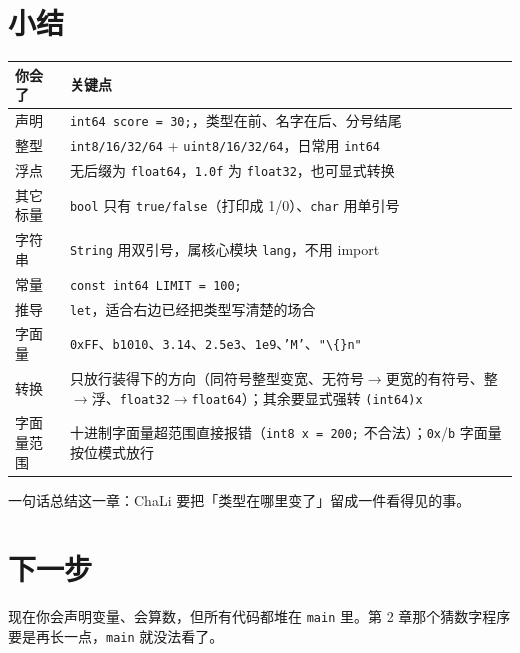 \section{小结}

{\small\setlength{\tabcolsep}{4pt}
\begin{longtable}{>{\raggedright\arraybackslash}p{}>{\raggedright\arraybackslash}p{}}
\toprule
你会了 & 关键点 \\
\midrule
\endhead
声明 & \texttt{int64 score =\allowbreak{} 30;}，类型在前、名字在后、分号结尾 \\
整型 & \texttt{int8/\allowbreak{}16/\allowbreak{}32/\allowbreak{}64} + \texttt{uint8/\allowbreak{}16/\allowbreak{}32/\allowbreak{}64}，日常用 \texttt{int64} \\
浮点 & 无后缀为 \texttt{float64}，\texttt{1.\allowbreak{}0f} 为 \texttt{float32}，也可显式转换 \\
其它标量 & \texttt{bool} 只有 \texttt{true/\allowbreak{}false}（打印成 1/0）、\texttt{char} 用单引号 \\
字符串 & \texttt{String} 用双引号，属核心模块 \texttt{lang}，不用 import \\
常量 & \texttt{const int64 LIMIT =\allowbreak{} 100;} \\
推导 & \texttt{let}，适合右边已经把类型写清楚的场合 \\
字面量 & \texttt{0x\allowbreak{}FF}、\texttt{b1010}、\texttt{3.\allowbreak{}14}、\texttt{2.\allowbreak{}5e3}、\texttt{1e9}、\texttt{'M'}、\texttt{"\textbackslash\{\}n"} \\
转换 & 只放行装得下的方向（同符号整型变宽、无符号\ensuremath{\rightarrow}更宽的有符号、整\ensuremath{\rightarrow}浮、\texttt{float32}\ensuremath{\rightarrow}\texttt{float64}）；其余要显式强转 \texttt{(\allowbreak{}int64)\allowbreak{}x} \\
字面量范围 & 十进制字面量超范围直接报错（\texttt{int8 x =\allowbreak{} 200;} 不合法）；\texttt{0x}/\texttt{b} 字面量按位模式放行 \\
\bottomrule
\end{longtable}
}

一句话总结这一章：ChaLi 要把「类型在哪里变了」留成一件看得见的事。

\section{下一步}

现在你会声明变量、会算数，但所有代码都堆在 \texttt{main} 里。第 2 章那个猜数字程序要是再长一点，\texttt{main} 就没法看了。

